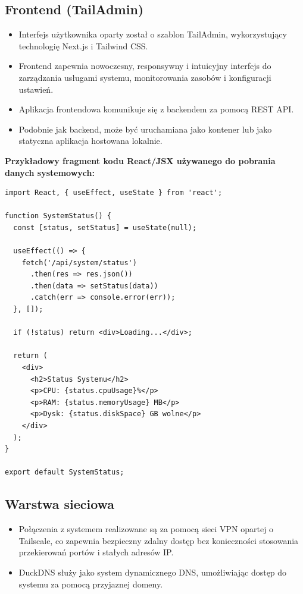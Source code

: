 \subsection{Frontend (TailAdmin)}
\begin{itemize}
    \item Interfejs użytkownika oparty został o szablon TailAdmin, wykorzystujący technologię Next.js i Tailwind CSS.
    \item Frontend zapewnia nowoczesny, responsywny i intuicyjny interfejs do zarządzania usługami systemu, monitorowania zasobów i konfiguracji ustawień.
    \item Aplikacja frontendowa komunikuje się z backendem za pomocą REST API.
    \item Podobnie jak backend, może być uruchamiana jako kontener lub jako statyczna aplikacja hostowana lokalnie.
\end{itemize}

\textbf{Przykładowy fragment kodu React/JSX używanego do pobrania danych systemowych:}
\begin{lstlisting}
import React, { useEffect, useState } from 'react';

function SystemStatus() {
  const [status, setStatus] = useState(null);

  useEffect(() => {
    fetch('/api/system/status')
      .then(res => res.json())
      .then(data => setStatus(data))
      .catch(err => console.error(err));
  }, []);

  if (!status) return <div>Loading...</div>;

  return (
    <div>
      <h2>Status Systemu</h2>
      <p>CPU: {status.cpuUsage}%</p>
      <p>RAM: {status.memoryUsage} MB</p>
      <p>Dysk: {status.diskSpace} GB wolne</p>
    </div>
  );
}

export default SystemStatus;
\end{lstlisting}

\subsection{Warstwa sieciowa}
\begin{itemize}
    \item Połączenia z systemem realizowane są za pomocą sieci VPN opartej o Tailscale, co zapewnia bezpieczny zdalny dostęp bez konieczności stosowania przekierowań portów i stałych adresów IP.
    \item DuckDNS służy jako system dynamicznego DNS, umożliwiając dostęp do systemu za pomocą przyjaznej domeny.
\end{itemize}
